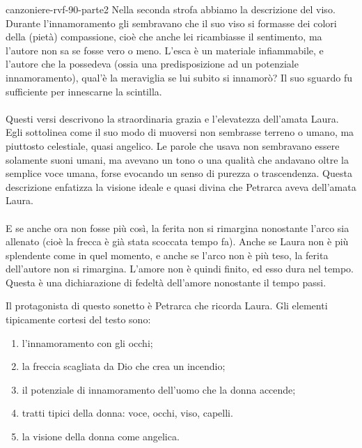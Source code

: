 \documentclass[preview]{standalone}
\begin{document}
\begin{snippet}{canzoniere-rvf-90-parte2}
     Nella seconda strofa abbiamo la descrizione del viso.
    Durante l'innamoramento gli sembravano che il suo viso si formasse dei colori della (pietà) compassione,
    cioè che anche lei ricambiasse il sentimento, ma l'autore non sa se fosse vero o meno.
    L'esca è un materiale infiammabile, e l'autore che la possedeva (ossia una predisposizione ad un potenziale innamoramento),
    qual'è la meraviglia se lui subito si innamorò? Il suo sguardo fu sufficiente per innescarne la scintilla.
    \\\\
     Questi versi descrivono la straordinaria grazia e l'elevatezza dell'amata Laura.
    Egli sottolinea come il suo modo di muoversi non sembrasse terreno o umano, ma piuttosto celestiale,
    quasi angelico. Le parole che usava non sembravano essere solamente suoni umani,
    ma avevano un tono o una qualità che andavano oltre la semplice voce umana, forse evocando
    un senso di purezza o trascendenza.
    Questa descrizione enfatizza la visione ideale e quasi divina che Petrarca aveva dell'amata Laura.
    \\\\
     E se anche ora non fosse più così, la ferita non si rimargina nonostante l'arco sia allenato (cioè la frecca è già stata scoccata tempo fa).
    Anche se Laura non è più splendente come in quel momento, e anche se l'arco non è più teso, la ferita dell'autore non si rimargina.
    L'amore non è quindi finito, ed esso dura nel tempo. Questa è una dichiarazione di fedeltà dell'amore nonostante il tempo passi.

    Il protagonista di questo sonetto è Petrarca che ricorda Laura.
    Gli elementi tipicamente cortesi del testo sono:
    \begin{enumerate}
        \item l'innamoramento con gli occhi;
        \item la freccia scagliata da Dio che crea un incendio;
        \item il potenziale di innamoramento dell'uomo che la donna accende;
        \item tratti tipici della donna: voce, occhi, viso, capelli.
        \item la visione della donna come angelica.
    \end{enumerate}


\end{snippet}
\end{document}
